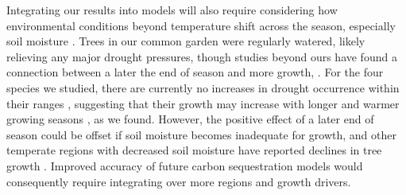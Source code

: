 Integrating our results into models will also require considering how environmental conditions beyond temperature shift across the season, especially soil moisture \citep{gaoEarlierStartThermal2022,li_widespread_2023}. Trees in our common garden were regularly watered, likely relieving any major drought pressures, though studies beyond ours have found a connection between a later the end of season and more growth, \citep[see:][]{gaoEarlierStartThermal2022,wang_seasonal_2025}. For the four species we studied, there are currently no increases in drought occurrence within their ranges \citep{nationalcentersforenvironmentalinformationncei_north_2026,agel_drought_2025}, suggesting that their growth may increase with longer and warmer growing seasons \citep{cook_uncertainty_2011,agel_drought_2025}, as we found. However, the positive effect of a later end of season could be offset if soil moisture becomes inadequate for growth, and other temperate regions with decreased soil moisture have reported declines in tree growth \citep[e.g.,][]{chiang_evidence_2021,spinoni_will_2018}. Improved accuracy of future carbon sequestration models would consequently require integrating over more regions and growth drivers.


